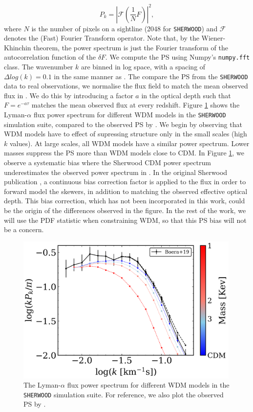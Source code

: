 \begin{equation}\label{eq: PS def}
        P_k = \left| \mathcal{F}(\frac{1}{N} F)  \right| ^2,
\end{equation}
where $N$ is the number of pixels on a sightline (2048 for \texttt{SHERWOOD}) and $\mathcal{F}$ denotes the (Fast) Fourier Transform operator. Note that, by the Wiener-Khinchin theorem, the power spectrum is just the Fourier transform of the autocorrelation function of the $\delta F$. We compute the PS using Numpy's \texttt{numpy.fft} class. The wavenumber $k$ are binned in log space, with a spacing of $\Delta log(k)=0.1$ in the same manner as \cite{Boera_2019}. The compare the PS from the \texttt{SHERWOOD} data to real observations, we normalise the flux field to match the mean observed flux in \cite{Becker_mean_flux}. We do this by introducing a factor $a$ in the optical depth such that $F=e^{-a\tau}$ matches the mean observed flux at every redshift. Figure \ref{fig: sherwood exact PS} shows the Lyman-$\alpha$ flux power spectrum for different WDM models in the \texttt{SHERWOOD} simulation suite, compared to the observed PS by \cite{Boera_2019}. We begin by observing that WDM models have to effect of supressing structure only in the small scales (high $k$ values). At large scales, all WDM models have a similar power spectrum. Lower masses suppress the PS more than WDM models close to CDM.
In Figure \ref{fig: sherwood exact PS}, we observe a systematic bias where the Sherwood CDM power spectrum underestimates the observed power spectrum in \cite{Boera_2019}. In the original Sherwood publication \cite{Bolton_2016}, a continuous bias correction factor is applied to the flux in order to forward model the skewers, in addition to matching the observed effective optical depth. This bias correction, which has not been incorporated in this work, could be the origin of the differences observed in the figure. In the rest of the work, we will use the PDF statistic when constraining WDM, so that this PS bias will not be a concern.

\begin{figure}[ht]
        \centering
        \includegraphics[width=0.99\textwidth]{img/ML/PS_sherwood.png}
        \caption{The Lyman-$\alpha$ flux power spectrum for different WDM models in the \texttt{SHERWOOD} simulation suite. For reference, we also plot the observed PS by \cite{Boera_2019}.}
        \label{fig: sherwood exact PS}     
\end{figure}


